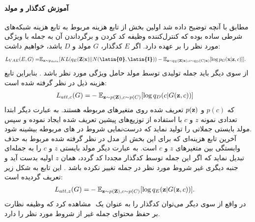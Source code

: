 \paragraph*{آموزش کدگذار و مولد}
مطابق با آنچه توضیح داده شد اولین بخش از تابع هزینه مربوط به تابع هزینه شبکه‌های \vae{} شرطی ساده بوده که کنترل‌کننده وظیفه کد کردن و برگرداندن آن به جمله با ویژگی مورد نظر را بر عهده دارد. اگر $E$ کدگذار، $G$ مولد و $D$ \discriminator{} باشد، خواهیم داشت:
\begin{equation}
\begin{split}
L_{VAE} (E, G) =& \expected_{\bff{x} \sim p_{data}} [KL (q_E(\bff{Z}|\bff{x}) || N(\textbf{\latin{0}},\textbf{\latin{I}})) - \expected_{\bff{z} \sim q_E(\bff{Z}|\bff{x}), c \sim q_D(C|\bff{x})} [\log p_G(\bff{x}|\bff{z},c)]].
\end{split}
\end{equation}
از سوی دیگر باید جمله تولیدی توسط مولد حامل ویژگی مورد نظر باشد \cite{toward}. بنابراین تابع هزینه ذیل در نظر گرفته شده است:
\begin{equation}
\begin{split}
L_{att, c} (G) =& -\mathbb E_{{\bf z} \sim p({\bf Z}), c \sim p(C)} [\log q_D(c|G({\bf z}, c))]
\end{split}
\end{equation}
که $p(c)$ و $p({\bf z})$
تعریف شده روی متغیرهای مربوطه هستند. به عبارت دیگر ابتدا تعدادی نمونه $z$ و $c$ با استفاده از توزیع‌های پیشین تعریف شده ایجاد نموده و سپس مولد بایستی جملاتی را تولید نماید که درست‌نمایی شروط در \discriminator{}‌های مربوطه بیشینه شود.\\
آخرین تابع هزینه‌ای که برای این بخش از مدل در نظر گرفته شده مربوط به حذف وابستگی بین متغیرهای $z$ و $c$ است. به عبارت دیگر مولد بایستی $z$ و $c$ را به جمله‌ای تبدیل نماید که اگر این جمله توسط کدگذار مجددا کد گردد، همان $z$ اولیه بدست آید و جنبه دیگری غیر شروط مورد نظر در جمله تغییر نکرده باشد \cite{toward}. این تابع به شکل زیر تعریف گردیده است:
\begin{equation}
\begin{split}
L_{att, z} (G) =& -\mathbb E_{{\bf z} \sim p({\bf Z}), c \sim p(C)} [\log q_E({\bf z}|G({\bf z}, c))].
\end{split}
\end{equation}
در واقع از سوی دیگر می‌توان کدگذار را به عنوان یک \discriminator{}‌ مشاهده کرد که وظیفه نظارت بر حفظ محتوای جمله غیر از شروط مورد نظر را دارد.
